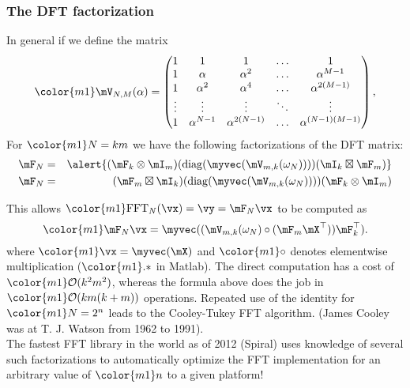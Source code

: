 \begin{frame}
\frametitle{The DFT factorization}
In general if we define the matrix 
$$\color{m1}
\mV_{N,M}(\alpha) = \begin{pmatrix} 
1 & 1 & 1 & \ldots & 1 \\
1 & \alpha & \alpha^2 & \ldots & \alpha^{M-1} \\
1 & \alpha^2 & \alpha^4 & \ldots & \alpha^{2(M-1)} \\
\vdots & \vdots & \vdots & \ddots & \vdots\\
1 & \alpha^{N-1} & \alpha^{2(N-1)} & \ldots & \alpha^{(N-1)(M-1)}
\end{pmatrix},
$$
For $\color{m1}N=km$ we have the following factorizations of the DFT matrix: 
{\color{m1}
\begin{eqnarray*}
\mF_{N} &=&
\alert{(\mF_k\otimes\mI_m)(\mathrm{diag}(\myvec(\mV_{m,k}(\omega_N))))(\mI_k\boxtimes\mF_m)}\\
\mF_{N} &=&
(\mF_m\boxtimes\mI_k)(\mathrm{diag}(\myvec(\mV_{m,k}(\omega_N))))(\mF_k\otimes\mI_m)
\end{eqnarray*}}
\end{frame}


\begin{frame}
This allows $\color{m1}\mathrm{FFT}_{N}(\vx)=\vy=\mF_{N}\vx$ to be computed as
$$\color{m1}
\mF_{N}\vx = \myvec((\mV_{m,k}(\omega_N)\circ(\mF_m\mX^\top))\mF_k^\top).
$$
where $\color{m1}\vx=\myvec(\mX)$ and $\color{m1}\circ$ denotes
elementwise multiplication ($\color{m1}.*$ in Matlab).
The direct computation has a cost of $\color{m1}\mathcal{O}(k^2m^2)$, whereas
the formula above does the job in $\color{m1}\mathcal{O}(km(k+m))$ operations.
Repeated use of the identity for $\color{m1}N=2^n$ leads to the Cooley-Tukey
FFT algorithm.  (James Cooley was at T. J. Watson from 1962 to 1991).\\
\medskip
The fastest FFT library in the world as of 2012 (\alert{Spiral}) uses
knowledge of several such factorizations to automatically 
optimize the FFT implementation for an arbitrary value of
$\color{m1}n$ to a given platform!
\end{frame}

